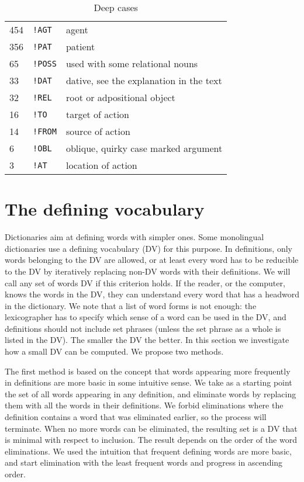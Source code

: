\documentclass[a4paper,10pt]{article}
\begin{document}
\begin{table}
\begin{center}
\begin{tabular}{lll}
\\ 454	& \texttt{!AGT}	& agent
\\ 356	& \texttt{!PAT}	& patient
\\ 65	& \texttt{!POSS}& used with some relational nouns %
\\ 33	& \texttt{!DAT}	& dative, see the explanation in the text
\\ 32	& \texttt{!REL} & root or adpositional object
\\ 16	& \texttt{!TO}	& target of action %
\\ 14	& \texttt{!FROM}& source of action
\\ 6	& \texttt{!OBL} & oblique, quirky case marked argument
\\ 3	& \texttt{!AT}	& location of action
\end{tabular}

\end{center}
\caption{Deep cases}
\label{table_deep}
\end{table}
\section{The defining vocabulary}\label{sec_dv}%
Dictionaries aim at defining words with simpler ones. Some monolingual
dictionaries use a defining vocabulary (DV) for this purpose. In definitions,
only words belonging to the DV are allowed, or at least every word has to be
reducible to the DV by iteratively replacing non-DV words with their
definitions. We will call any set of words DV if this criterion holds.  If the
reader, or the computer, knows the words in the DV, they can understand every
word that has a headword in the dictionary.  We note that a list of word forms
is not enough: the lexicographer has to specify which sense of a word can be
used in the DV, and definitions should not include set phrases (unless the set
phrase as a whole is listed in the DV). The smaller the DV the better. In this
section we investigate how a small DV can be computed. We propose two methods.

The first method is based on the concept that words appearing more frequently
in definitions are more basic in some intuitive sense. We take as a starting
point the set of all words appearing in any definition, and eliminate words by
replacing them with all the words in their definitions. We forbid eliminations
where the definition contains a word that was eliminated earlier, so the
process will terminate. When no more words can be eliminated, the resulting
set is a DV that is minimal with respect to inclusion. The result depends on
the order of the word eliminations. We used the intuition that frequent
defining words are more basic, and start elimination with the least frequent
words and progress in ascending order.
\end{document}
